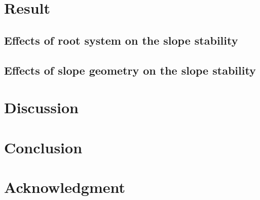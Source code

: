 \section{Result}


\subsection{Effects of root system on the slope stability}


\subsection{Effects of slope geometry on the slope stability}


\section{Discussion}


\section{Conclusion}



\section{Acknowledgment}




%

%
%




